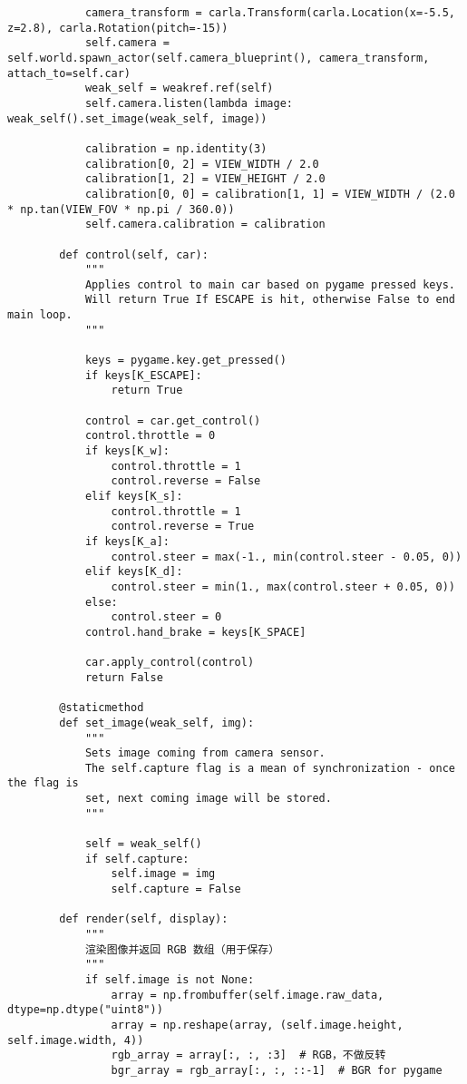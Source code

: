 \begin{lstlisting}
	        camera_transform = carla.Transform(carla.Location(x=-5.5, z=2.8), carla.Rotation(pitch=-15))
	        self.camera = self.world.spawn_actor(self.camera_blueprint(), camera_transform, attach_to=self.car)
	        weak_self = weakref.ref(self)
	        self.camera.listen(lambda image: weak_self().set_image(weak_self, image))
	
	        calibration = np.identity(3)
	        calibration[0, 2] = VIEW_WIDTH / 2.0
	        calibration[1, 2] = VIEW_HEIGHT / 2.0
	        calibration[0, 0] = calibration[1, 1] = VIEW_WIDTH / (2.0 * np.tan(VIEW_FOV * np.pi / 360.0))
	        self.camera.calibration = calibration
	
	    def control(self, car):
	        """
	        Applies control to main car based on pygame pressed keys.
	        Will return True If ESCAPE is hit, otherwise False to end main loop.
	        """
	
	        keys = pygame.key.get_pressed()
	        if keys[K_ESCAPE]:
	            return True
	
	        control = car.get_control()
	        control.throttle = 0
	        if keys[K_w]:
	            control.throttle = 1
	            control.reverse = False
	        elif keys[K_s]:
	            control.throttle = 1
	            control.reverse = True
	        if keys[K_a]:
	            control.steer = max(-1., min(control.steer - 0.05, 0))
	        elif keys[K_d]:
	            control.steer = min(1., max(control.steer + 0.05, 0))
	        else:
	            control.steer = 0
	        control.hand_brake = keys[K_SPACE]
	
	        car.apply_control(control)
	        return False
	
	    @staticmethod
	    def set_image(weak_self, img):
	        """
	        Sets image coming from camera sensor.
	        The self.capture flag is a mean of synchronization - once the flag is
	        set, next coming image will be stored.
	        """
	
	        self = weak_self()
	        if self.capture:
	            self.image = img
	            self.capture = False
	
	    def render(self, display):
	        """
	        渲染图像并返回 RGB 数组（用于保存）
	        """
	        if self.image is not None:
	            array = np.frombuffer(self.image.raw_data, dtype=np.dtype("uint8"))
	            array = np.reshape(array, (self.image.height, self.image.width, 4))
	            rgb_array = array[:, :, :3]  # RGB，不做反转
	            bgr_array = rgb_array[:, :, ::-1]  # BGR for pygame
	

\end{lstlisting}
